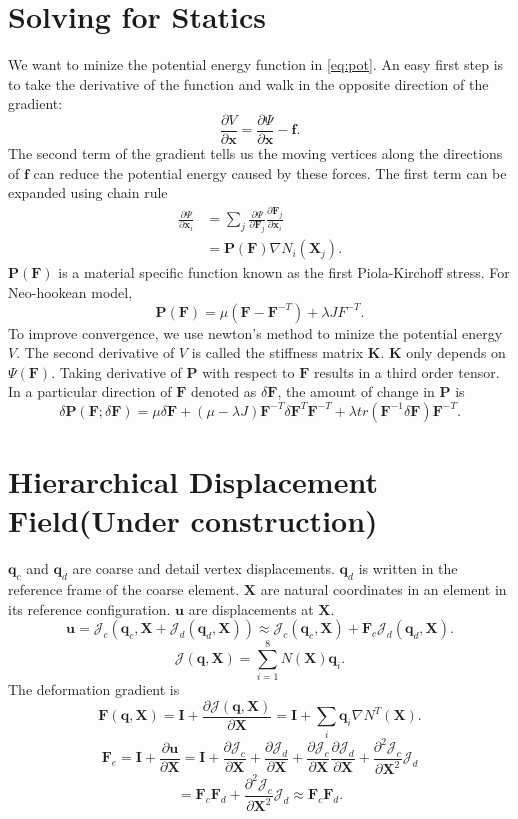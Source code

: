 \documentclass{article}
\newcommand{\mcJ}{\mathcal{J}}
\newcommand{\mbF}{\mathbf{F}}
\newcommand{\dmbF}{\delta\mathbf{F}}
\newcommand{\mbI}{\mathbf{I}}
\newcommand{\mbK}{\mathbf{K}}
\newcommand{\mbP}{\mathbf{P}}
\newcommand{\mbX}{\mathbf{X}}
\newcommand{\mbx}{\mathbf{x}}
\newcommand{\mbf}{\mathbf{f}}
\newcommand{\mbq}{\mathbf{q}}
\newcommand{\mbu}{\mathbf{u}}
\begin{document}
\section{Solving for Statics}
	We want to minize the potential energy function in \autoref{eq:pot}.
	An easy first step is to take the derivative of the function and walk in the
	opposite direction of the gradient:
	\begin{equation}
	\frac{\partial V}{\partial \mbx} = \frac{\partial\Psi}{\partial\mbx} - \mbf.
	\end{equation}
	The second term of the gradient tells us the moving vertices along the directions of
	$\mbf$ can reduce the potential energy caused by these forces.
	The first term can be expanded using chain rule
	\begin{align}
	\frac{\partial\Psi}{\partial\mbx_i} &= \sum_j\frac{\partial\Psi}{\partial\mbF_j} \frac{\partial\mbF_j}{\partial\mbx_i}\\
	&=\mbP(\mbF)\nabla N_i(\mbX_j).
	\end{align}
	$\mbP(\mbF)$ is a material specific function known as the first Piola-Kirchoff stress.
	For Neo-hookean model,
	\[\mbP(\mbF) = \mu(\mbF-\mbF^{-T})+\lambda JF^{-T}.\]
	To improve convergence, we use newton's method to minize the potential energy $V$.
	The second derivative of $V$ is called the stiffness matrix $\mbK$.
	$\mbK$ only depends on $\Psi(\mbF)$.
	Taking derivative of $\mbP$ with respect to $\mbF$ results in a third order tensor.
	In a particular direction of $\mbF$ denoted as $\dmbF$, the amount of change
	in $\mbP$ is
	\[
	\delta\mbP(\mbF;\dmbF) = \mu\dmbF+(\mu-\lambda J)\mbF^{-T}\dmbF^T\mbF^{-T}	+\lambda tr(\mbF^{-1}\dmbF)\mbF^{-T}.
	\]

\section{Hierarchical Displacement Field(Under construction)}
$\mbq_c$ and $\mbq_d$ are coarse and detail vertex displacements.
$\mbq_d$ is written in the reference frame of the coarse element.
$\mathbf{X}$ are natural coordinates in an element in its reference configuration.
$\mathbf{u}$ are displacements at $\mathbf{X}$.
\[
\mbu = \mcJ_c(\mbq_c, \mbX + \mcJ_d(\mbq_d,\mbX))
\approx \mcJ_c(\mbq_c, \mbX) + \mbF_c\mcJ_d(\mbq_d,\mbX).
\]
\[
\mcJ(\mbq,\mbX) = \sum_{i=1}^8 N(\mbX)\mbq_i.
\]
The deformation gradient is
\[
\mbF (\mbq,\mbX) = \mbI+\frac{\partial\mcJ(\mbq, \mbX)}{\partial\mbX}=
\mbI+ \sum_i \mbq_i \nabla N^T(\mbX).
\]
\[
\mbF_e = \mbI+\frac{\partial \mbu}{\partial \mbX} 
=\mbI + \frac{\partial \mcJ_c}{\partial\mbX} 
+ \frac{\partial \mcJ_d}{\partial\mbX} + 
\frac{\partial \mcJ_c}{\partial\mbX}\frac{\partial \mcJ_d}{\partial\mbX} 
+ \frac{\partial^2\mcJ_c}{\partial\mbX^2}\mcJ_d
\]
\[=\mbF_c\mbF_d + \frac{\partial^2\mcJ_c}{\partial\mbX^2}\mcJ_d
\approx \mbF_c\mbF_d.
\]
\end{document}
